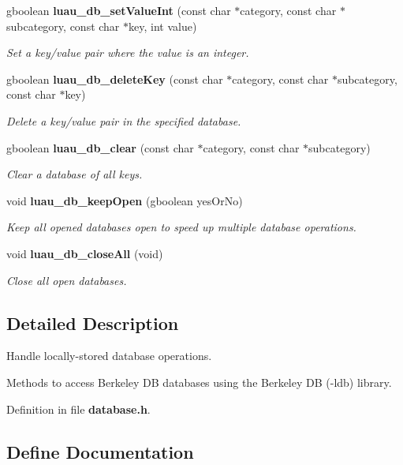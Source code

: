 \begin{CompactItemize}
gboolean {\bf luau\_\-db\_\-set\-Value\-Int} (const char $\ast$category, const char $\ast$subcategory, const char $\ast$key, int value)
\begin{CompactList}\small\item\em Set a key/value pair where the value is an integer. \item\end{CompactList}\item 
gboolean {\bf luau\_\-db\_\-delete\-Key} (const char $\ast$category, const char $\ast$subcategory, const char $\ast$key)
\begin{CompactList}\small\item\em Delete a key/value pair in the specified database. \item\end{CompactList}\item 
gboolean {\bf luau\_\-db\_\-clear} (const char $\ast$category, const char $\ast$subcategory)
\begin{CompactList}\small\item\em Clear a database of all keys. \item\end{CompactList}\item 
void {\bf luau\_\-db\_\-keep\-Open} (gboolean yes\-Or\-No)
\begin{CompactList}\small\item\em Keep all opened databases open to speed up multiple database operations. \item\end{CompactList}\item 
void {\bf luau\_\-db\_\-close\-All} (void)
\begin{CompactList}\small\item\em Close all open databases. \item\end{CompactList}\end{CompactItemize}


\subsection{Detailed Description}
Handle locally-stored database operations. 

Methods to access Berkeley DB databases using the Berkeley DB (-ldb) library.

Definition in file {\bf database.h}.

\subsection{Define Documentation}
